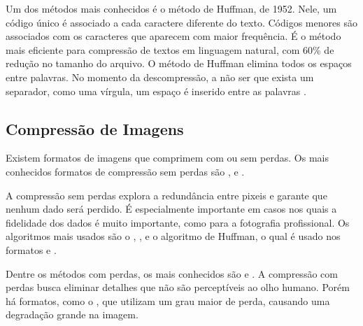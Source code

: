 Um dos métodos mais conhecidos é o método de Huffman, de 1952. Nele, um código único é associado a cada caractere diferente do texto. Códigos menores são associados com os caracteres que aparecem com maior frequência. É o método mais eficiente para compressão de textos em linguagem natural, com 60\% de redução no tamanho do arquivo. O método de Huffman elimina todos os espaços entre palavras. No momento da descompressão, a não ser que exista um separador, como uma vírgula, um espaço é inserido entre as palavras \cite{Salomon2007}.

\subsection{Compressão de Imagens}

Existem formatos de imagens que comprimem com ou sem perdas. Os mais conhecidos formatos de compressão sem perdas são \png, \jpegg e \tiff.

A compressão sem perdas explora a redundância entre pixeis e garante que nenhum dado será perdido. É especialmente importante em casos nos quais a fidelidade dos dados é muito importante, como para a fotografia profissional. Os algoritmos mais usados são o \rle, \lz, \lzw e o algoritmo de Huffman, o qual é usado nos formatos \png e \tiff.


Dentre os métodos com perdas, os mais conhecidos são \jpeg e \gif. A compressão com perdas busca eliminar detalhes que não são perceptíveis ao olho humano. Porém há formatos, como o \gif, que utilizam um grau maior de perda, causando uma degradação grande na imagem.

